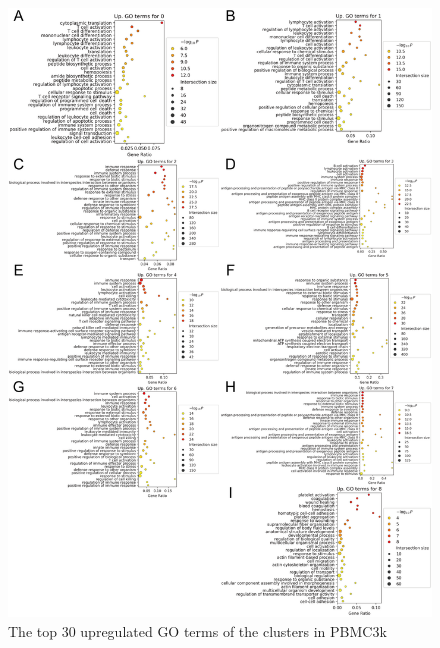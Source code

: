 \documentclass{article}
\begin{document}
\begin{figure}[htb]
  \centering
  \includegraphics[scale=0.7]{./figs/exported/figure_s5.png}
  \caption{The top 30 upregulated GO terms of the clusters in PBMC3k}
  \label{fig_s5}
\end{figure}
\end{document}
